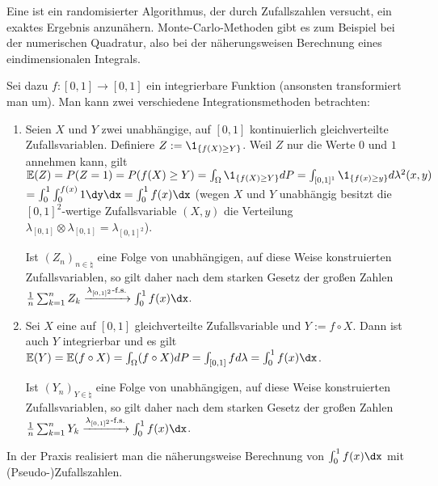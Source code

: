 \begin{Bem}
    Eine  ist ein randomisierter Algorithmus,
    der durch Zufallszahlen versucht, ein exaktes Ergebnis anzunähern.
    Monte-Carlo-Methoden gibt es zum Beispiel bei der numerischen Quadratur,
    also bei der näherungsweisen Berechnung eines eindimensionalen Integrals.
    
    Sei dazu $f\colon [0, 1] \rightarrow [0, 1]$ ein integrierbare Funktion
    (ansonsten transformiert man um).
    Man kann zwei verschiedene Integrationsmethoden betrachten:
    \begin{enumerate}
        \item
        Seien $X$ und $Y$ zwei unabhängige, auf $[0, 1]$ kontinuierlich gleichverteilte
        Zufallsvariablen.
        Definiere $Z := \1_{\{f(X) \ge Y\}}$.
        Weil $Z$ nur die Werte $0$ und $1$ annehmen kann, gilt\\
        $\EW(Z) = P(Z = 1) = P(f(X) \ge Y) = \int_\Omega \1_{\{f(X) \ge Y\}} dP
        = \int_{[0, 1]^1} \1_{\{f(x) \ge y\}} d\lambda^2(x, y)$\\
        $= \int_0^1 \int_0^{f(x)} 1 \dy\dx = \int_0^1 f(x)\dx$
        (wegen $X$ und $Y$ unabhängig besitzt die $[0, 1]^2$-wertige Zufallsvariable
        $(X, y)$ die Verteilung $\lambda_{[0, 1]} \otimes \lambda_{[0, 1]} = \lambda_{[0, 1]^2}$).
        
        Ist $(Z_n)_{n \in \natural}$ eine Folge von unabhängigen, auf diese Weise konstruierten
        Zufallsvariablen, so gilt daher nach dem starken Gesetz der großen Zahlen
        $\frac{1}{n} \sum_{k=1}^n Z_k \xrightarrow{\lambda_{[0,1]^2}\text{-f.s.}} \int_0^1 f(x)\dx$.
        
        \item
        Sei $X$ eine auf $[0, 1]$ gleichverteilte Zufallsvariable und $Y := f \circ X$.
        Dann ist auch $Y$ integrierbar und es gilt
        $\EW(Y) = \EW(f \circ X) = \int_\Omega (f \circ X)dP =
        \int_{[0, 1]} fd\lambda = \int_0^1 f(x)\dx$.
        
        Ist $(Y_n)_{Y \in \natural}$ eine Folge von unabhängigen, auf diese Weise konstruierten
        Zufallsvariablen, so gilt daher nach dem starken Gesetz der großen Zahlen
        $\frac{1}{n} \sum_{k=1}^n Y_k \xrightarrow{\lambda_{[0,1]^2}\text{-f.s.}} \int_0^1 f(x)\dx$.
    \end{enumerate}
    In der Praxis realisiert man die näherungsweise Berechnung von $\int_0^1 f(x)\dx$ mit\\
    (Pseudo-)Zufallszahlen.
\end{Bem}

